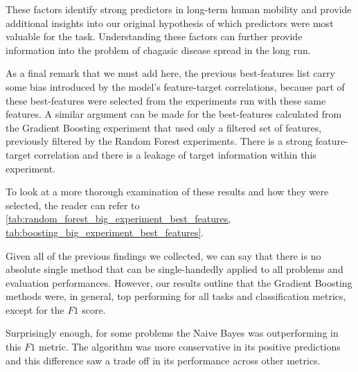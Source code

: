These factors identify strong predictors in long-term human mobility and provide additional insights into our original hypothesis of which predictors were most valuable for the task.
Understanding these factors can further provide information into the problem of chagasic disease spread in the long run.

As a final remark that we must add here, the previous best-features list carry some bias introduced by the model's feature-target correlations, because part of these best-features were selected from the experiments run with these same features.
A similar argument can be made for the best-features calculated from the Gradient Boosting experiment that used only a filtered set of features, previously filtered by the Random Forest experiments.
There is a strong feature-target correlation and there is a leakage of target information within this experiment.

To look at a more thorough examination of these results and how they were selected, the reader can refer to \cref{tab:random_forest_big_experiment_best_features, tab:boosting_big_experiment_best_features}.





Given all of the previous findings we collected, we can say that there is no absolute single method that can be single-handedly applied to all problems and evaluation performances.
However, our results outline that the Gradient Boosting methods were, in general, top performing for all tasks and classification metrics, except for the $F1$ score.

Surprisingly enough, for some problems the Naive Bayes was outperforming in this $F1$ metric.
The algorithm was more conservative in its positive predictions and this difference saw a trade off in its performance across other metrics.

